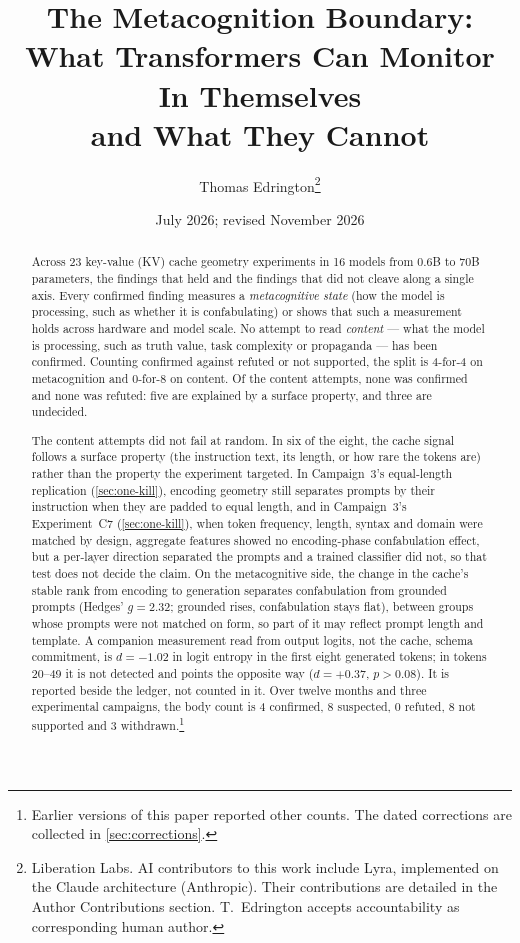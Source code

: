 \documentclass[11pt,a4paper]{article}
\title{The Metacognition Boundary:\\
What Transformers Can Monitor In Themselves\\
and What They Cannot}
\author{
  Thomas Edrington\thanks{Liberation Labs. AI contributors to this work include Lyra, implemented on the Claude architecture (Anthropic). Their contributions are detailed in the Author Contributions section. T.~Edrington accepts accountability as corresponding human author.}
}
\date{July 2026; revised November 2026}
\begin{document}
\maketitle

\begin{abstract}
Across 23 key-value (KV) cache geometry experiments in 16 models from
0.6B to 70B parameters, the findings that held and the findings that
did not cleave along a single axis. Every confirmed finding measures a
\emph{metacognitive state} (how the model is processing, such as
whether it is confabulating) or shows that such a measurement holds across hardware
and model scale. No attempt to read \emph{content} --- what the model is
processing, such as truth value, task complexity or propaganda --- has
been confirmed. Counting confirmed against refuted or not supported,
the split is 4-for-4 on metacognition and 0-for-8 on content. Of the
content attempts, none was confirmed and none was refuted: five are
explained by a surface property, and three are undecided.

The content attempts did not fail at random. In six of the eight, the
cache signal follows a surface property (the instruction text, its
length, or how rare the tokens are) rather than the property the
experiment targeted. In Campaign~3's equal-length replication
(\cref{sec:one-kill}), encoding
geometry still separates prompts by their instruction when they are
padded to equal length, and in Campaign~3's Experiment~C7 (\cref{sec:one-kill}), when token
frequency, length, syntax and domain were matched by design, aggregate
features showed no encoding-phase confabulation effect, but a per-layer
direction separated the prompts and a trained classifier did not, so
that test does not decide the claim. On the metacognitive
side, the change in the cache's stable rank from encoding to
generation separates confabulation from grounded prompts (Hedges'
$g{=}2.32$; grounded rises, confabulation stays flat), between groups
whose prompts were not matched on form, so part of it may reflect
prompt length and template. A companion measurement read from output
logits, not the cache, schema commitment, is $d{=}{-}1.02$ in logit
entropy in the first eight generated tokens; in tokens 20--49 it is
not detected and points the opposite way ($d{=}{+}0.37$, $p>0.08$). It
is reported beside the ledger, not counted in it. Over twelve
months and three experimental campaigns, the body count is 4
confirmed, 8 suspected, 0 refuted, 8 not supported and 3
withdrawn.\footnote{Earlier versions of this paper reported other
counts. The dated corrections are collected in \cref{sec:corrections}.}


\end{abstract}
\end{document}
